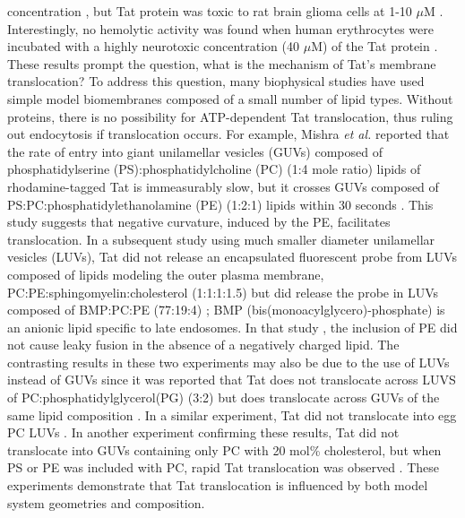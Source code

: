 concentration \cite{Vives97}, but Tat protein was toxic 
to rat brain glioma cells at 1-10 $\mu$M \cite{Sabatier91}. 
Interestingly, no hemolytic activity was found when human erythrocytes
were incubated with a highly neurotoxic concentration (40 $\mu$M) of the Tat protein 
\cite{Sabatier91}. 
These results prompt the question, what is the mechanism of 
Tat’s membrane translocation?
To address this question, many biophysical studies have used simple model
biomembranes composed of a small number of lipid types. 
Without proteins, there is no possibility for ATP-dependent Tat translocation, 
thus ruling out endocytosis if
translocation occurs. 
For example, Mishra \textit{et al.} reported that the rate of 
entry into giant
unilamellar vesicles (GUVs) composed of phosphatidylserine (PS):phosphatidylcholine (PC)
(1:4 mole ratio) lipids of rhodamine-tagged Tat
is immeasurably slow, but it crosses GUVs composed of 
PS:PC:phosphatidylethanolamine (PE) (1:2:1) lipids 
within 30 seconds \cite{Mishra08}. 
This study suggests that negative curvature, induced by the PE, 
facilitates translocation. 
In a subsequent study using much smaller diameter unilamellar vesicles (LUVs),
Tat did not release an encapsulated fluorescent probe from LUVs composed of 
lipids modeling the outer plasma membrane, PC:PE:sphingomyelin:cholesterol (1:1:1:1.5) 
but did release the probe in LUVs composed of BMP:PC:PE (77:19:4) \cite{Yang10}; 
BMP (bis(monoacylglycero)-phosphate) is an anionic lipid specific to late 
endosomes. 
In that study \cite{Yang10}, the inclusion of PE did not 
cause leaky fusion in the absence of a negatively charged lipid. 
The 
contrasting results in these two experiments may also be due to the use of LUVs 
instead of GUVs since it was reported that Tat does not translocate across LUVS 
of PC:phosphatidylglycerol(PG) (3:2) but does translocate across GUVs of the same lipid composition 
\cite{Thoren04}. In a similar experiment, Tat did not translocate into egg PC
LUVs \cite{Kramer03}. 
In another experiment confirming these results, Tat did 
not translocate into GUVs containing only PC with 20 mol\% cholesterol, but 
when PS or PE was included with PC, rapid Tat translocation was observed 
\cite{Ciobanasu10}. 
These experiments demonstrate that Tat translocation is influenced by both
model system geometries and composition.

